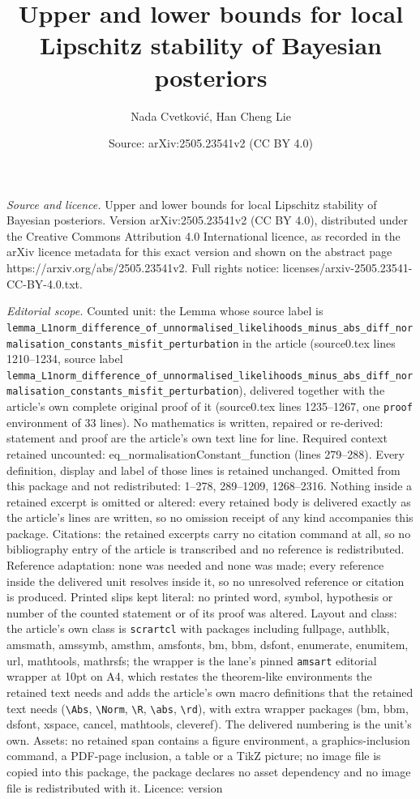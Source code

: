 \documentclass[10pt,a4paper]{amsart}
\title[Upper and lower bounds for local Lipschitz stability of Baye]{Upper and lower bounds for local Lipschitz stability of Bayesian posteriors}
\author{Nada Cvetkovi\'c, Han Cheng Lie}
\date{Source: arXiv:2505.23541v2 (CC BY 4.0)}
\begin{document}
\maketitle

\noindent\emph{Source and licence.} Upper and lower bounds for local Lipschitz stability of Bayesian posteriors. Version arXiv:2505.23541v2 (CC BY 4.0), distributed under the Creative Commons Attribution 4.0 International licence, as recorded in the arXiv licence metadata for this exact version and shown on the abstract page https://arxiv.org/abs/2505.23541v2. Full rights notice: licenses/arxiv-2505.23541-CC-BY-4.0.txt.\par\smallskip

\noindent\textit{Editorial scope.} Counted unit: the Lemma whose source label is \texttt{lemma\_L1norm\_difference\_of\_unnormalised\_likelihoods\_minus\_abs\_diff\_normalisation\_constants\_misfit\_perturbation} in the article (source0.tex lines 1210--1234, source label \texttt{lemma\_L1norm\_difference\_of\_unnormalised\_likelihoods\_minus\_abs\_diff\_normalisation\_constants\_misfit\_perturbation}), delivered together with the article's own complete original proof of it (source0.tex lines 1235--1267, one \texttt{proof} environment of 33 lines). No mathematics is written, repaired or re-derived: statement and proof are the article's own text line for line. Required context retained uncounted: eq\_normalisationConstant\_function (lines 279--288). Every definition, display and label of those lines is retained unchanged. Omitted from this package and not redistributed: 1--278, 289--1209, 1268--2316. Nothing inside a retained excerpt is omitted or altered: every retained body is delivered exactly as the article's lines are written, so no omission receipt of any kind accompanies this package. Citations: the retained excerpts carry no citation command at all, so no bibliography entry of the article is transcribed and no reference is redistributed. Reference adaptation: none was needed and none was made; every reference inside the delivered unit resolves inside it, so no unresolved reference or citation is produced. Printed slips kept literal: no printed word, symbol, hypothesis or number of the counted statement or of its proof was altered. Layout and class: the article's own class is \texttt{scrartcl} with packages including fullpage, authblk, amsmath, amssymb, amsthm, amsfonts, bm, bbm, dsfont, enumerate, enumitem, url, mathtools, mathrsfs; the wrapper is the lane's pinned \texttt{amsart} editorial wrapper at 10pt on A4, which restates the theorem-like environments the retained text needs and adds the article's own macro definitions that the retained text needs (\texttt{\textbackslash Abs}, \texttt{\textbackslash Norm}, \texttt{\textbackslash R}, \texttt{\textbackslash abs}, \texttt{\textbackslash rd}), with extra wrapper packages (bm, bbm, dsfont, xspace, cancel, mathtools, cleveref). The delivered numbering is the unit's own. Assets: no retained span contains a figure environment, a graphics-inclusion command, a PDF-page inclusion, a table or a TikZ picture; no image file is copied into this package, the package declares no asset dependency and no image file is redistributed with it. Licence: version 
\end{document}
